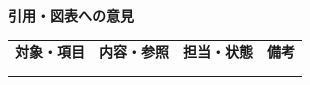 \documentclass[11pt,a4paper]{article}
\begin{document}
\par{}\noindent\textbf{引用・図表への意見}\par\vspace{1mm}
{\fontsize{8.5}{13}\selectfont
\begin{tabularx}{\linewidth}{@{}XXXX@{}}
\textbf{対象・項目} & \textbf{内容・参照} & \textbf{担当・状態} & \textbf{備考}\\[2mm]
\strut & \strut & \strut & \strut\\[5mm]
\strut & \strut & \strut & \strut\\[5mm]
\end{tabularx}
}\vspace{2mm}\par
\end{document}

